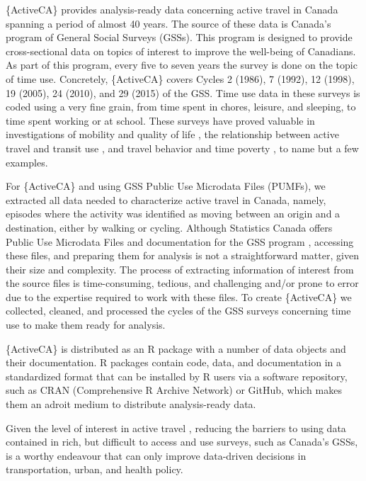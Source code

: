 \documentclass[Royal,times,sageh]{sagej}
\begin{document}
\{ActiveCA\} provides analysis-ready data concerning active travel in
Canada spanning a period of almost 40 years. The source of these data is
Canada's program of General Social Surveys (GSSs). This program is
designed to provide cross-sectional data on topics of interest to
improve the well-being of Canadians. As part of this program, every five
to seven years the survey is done on the topic of time use. Concretely,
\{ActiveCA\} covers Cycles 2 (1986), 7 (1992), 12 (1998), 19 (2005), 24
(2010), and 29 (2015) of the GSS. Time use data in these surveys is
coded using a very fine grain, from time spent in chores, leisure, and
sleeping, to time spent working or at school. These surveys have proved
valuable in investigations of mobility and quality of life
\citep{spinneyTransport2009}, the relationship between active travel and
transit use \citep{lachapelleLonger2016}, and travel behavior and time
poverty \citep{kimFacing2024}, to name but a few examples.

For \{ActiveCA\} and using GSS Public Use Microdata Files (PUMFs), we
extracted all data needed to characterize active travel in Canada,
namely, episodes where the activity was identified as moving between an
origin and a destination, either by walking or cycling. Although
Statistics Canada offers Public Use Microdata Files and documentation
for the GSS program \citep[see][]{statisticscanada2024}, accessing these
files, and preparing them for analysis is not a straightforward matter,
given their size and complexity. The process of extracting information
of interest from the source files is time-consuming, tedious, and
challenging and/or prone to error due to the expertise required to work
with these files. To create \{ActiveCA\} we collected, cleaned, and
processed the cycles of the GSS surveys concerning time use to make them
ready for analysis.

\{ActiveCA\} is distributed as an R package with a number of data
objects and their documentation. R packages contain code, data, and
documentation in a standardized format that can be installed by R users
via a software repository, such as CRAN (Comprehensive R Archive
Network) or GitHub, which makes them an adroit medium to distribute
analysis-ready data.

Given the level of interest in active travel
\citep[e.g.,][]{mccurdySupport2023}, reducing the barriers to using data
contained in rich, but difficult to access and use surveys, such as
Canada's GSSs, is a worthy endeavour that can only improve data-driven
decisions in transportation, urban, and health policy.
\end{document}
